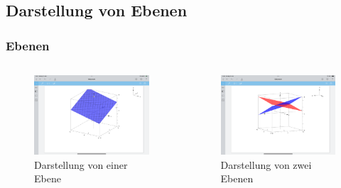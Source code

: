 \documentclass[10pt,ngerman]{beamer}
\begin{document}
\subsection{Darstellung von Ebenen}

\begin{frame}
	\frametitle{Ebenen}

	\begin{columns}
		\begin{column}{0.5\textwidth}
			\begin{figure}
				\centering
				\includegraphics[width=\textwidth]{IMG_1446.png}
				\caption{Darstellung von einer Ebene}
				\label{fig:Darstellung-Ebene}
			\end{figure}
		\end{column}

		\begin{column}{0.5\textwidth}
			\begin{figure}
				\centering
				\includegraphics[width=\textwidth]{IMG_1449.png}
				\caption{Darstellung von zwei Ebenen}
				\label{fig:Darstellung-Zwei-Ebenen}
			\end{figure}
		\end{column}
	\end{columns}
\end{frame}
\end{document}
